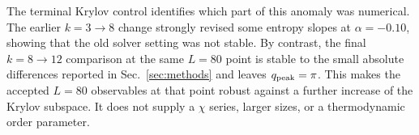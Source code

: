 The terminal Krylov control identifies which part of this anomaly was numerical.
The earlier $k=3\rightarrow8$ change strongly revised some entropy slopes at $\alpha=-0.10$, showing that the old solver setting was not stable.
By contrast, the final $k=8\rightarrow12$ comparison at the same $L=80$ point is stable to the small absolute differences reported in Sec.~\ref{sec:methods} and leaves $q_{\mathrm{peak}}=\pi$.
This makes the accepted $L=80$ observables at that point robust against a further increase of the Krylov subspace.
It does not supply a $\chi$ series, larger sizes, or a thermodynamic order parameter.
